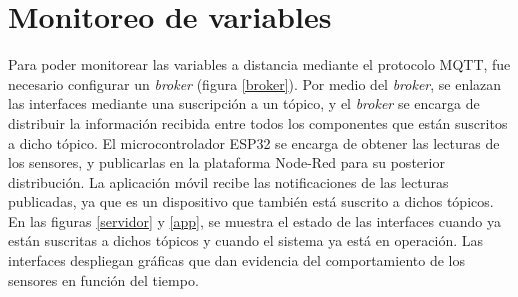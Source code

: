 \section{Monitoreo de variables}

Para poder monitorear las variables a distancia mediante el protocolo MQTT, fue necesario configurar un \textit{broker} (figura \ref{broker}). 
Por medio del \textit{broker}, se enlazan las interfaces mediante una suscripción a un tópico, y el \textit{broker} se encarga de distribuir la información recibida entre todos los componentes que están suscritos a dicho tópico. El microcontrolador ESP32 se encarga de obtener las lecturas de los sensores, y publicarlas en la plataforma Node-Red para su posterior distribución. La aplicación móvil recibe las notificaciones de las lecturas publicadas, ya que es un dispositivo que también está suscrito a dichos tópicos. En las figuras \ref{servidor} y \ref{app}, se muestra el estado de las interfaces cuando ya están suscritas a dichos tópicos y cuando el sistema ya está en operación. Las interfaces despliegan gráficas que dan evidencia del comportamiento de los sensores en función del tiempo.   

